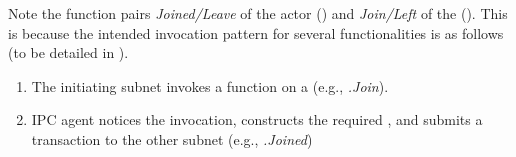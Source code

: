 Note the function pairs \emph{Joined/Leave} of the \gw actor () and \emph{Join/Left} of the \sa ().
This is because the intended invocation pattern for several functionalities is as follows (to be detailed in ).
\begin{enumerate}
    \item The initiating subnet invokes a function on a \actor (e.g., \emph{\sa.Join}).
    \item IPC agent notices the invocation, constructs the required \pof, and submits a transaction to the other subnet (e.g., \emph{\gw.Joined})
\end{enumerate}




